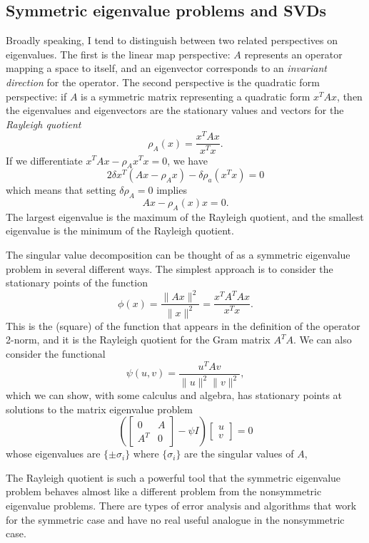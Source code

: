 \documentclass[12pt, leqno]{article}
\begin{document}
\subsection{Symmetric eigenvalue problems and SVDs}

Broadly speaking, I tend to distinguish between two related
perspectives on eigenvalues.  The first is the linear map
perspective: $A$ represents an operator mapping a space to itself,
and an eigenvector corresponds to an {\em invariant direction}
for the operator.  The second perspective is the quadratic form
perspective: if $A$ is a symmetric matrix representing a quadratic
form $x^T A x$, then the eigenvalues and eigenvectors are the
stationary values and vectors for the {\em Rayleigh quotient}
\[
  \rho_A(x) = \frac{x^T A x}{x^T x}.
\]
If we differentiate $x^T A x - \rho_A x^T x = 0$, we have
\[
  2 \delta x^T (Ax - \rho_A x) - \delta \rho_a (x^T x) = 0
\]
which means that setting $\delta \rho_A = 0$ implies
\[
  Ax-\rho_A(x) x = 0.
\]
The largest eigenvalue is the maximum of the Rayleigh quotient,
and the smallest eigenvalue is the minimum of the Rayleigh quotient.

The singular value decomposition can be thought of as a symmetric
eigenvalue problem in several different ways.  The simplest approach
is to consider the stationary points of the function
\[
  \phi(x) = \frac{\|Ax\|^2}{\|x\|^2} = \frac{x^T A^T A x}{x^T x}.
\]
This is the (square) of the function that appears in the definition of
the operator 2-norm, and it is the Rayleigh quotient for the Gram
matrix $A^T A$.  We can also consider the functional
\[
  \psi(u,v) = \frac{u^T A v}{\|u\|^2 \|v\|^2},
\]
which we can show, with some calculus and algebra,
has stationary points at solutions to the matrix eigenvalue problem
\[
\left( \begin{bmatrix} 0 & A \\ A^T & 0 \end{bmatrix} - \psi I \right)
\begin{bmatrix} u \\ v \end{bmatrix} = 0
\]
whose eigenvalues are $\{ \pm \sigma_i \}$ where $\{ \sigma_i \}$
are the singular values of $A$, 

The Rayleigh quotient is such a powerful tool that the symmetric
eigenvalue problem behaves almost like a different problem from
the nonsymmetric eigenvalue problems.  There are types of error
analysis and algorithms that work for the symmetric case and have
no real useful analogue in the nonsymmetric case.
\end{document}
